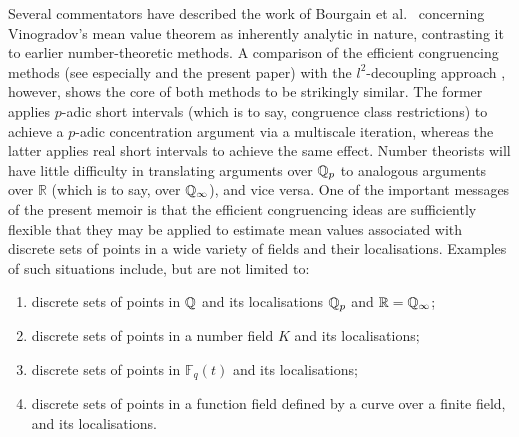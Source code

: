 \documentclass[12pt,reqno]{amsart}
\theoremstyle{definition}
\theoremstyle{remark}
\numberwithin{equation}{section}
\def\dbF{{\mathbb F}}\def\dbK{{\mathbb K}}
\def\dbR{{\mathbb R}}\def\dbT{{\mathbb T}}
\begin{document}
Several commentators have described the work of Bourgain et al.~\cite{BDG2016} 
concerning Vinogradov's mean value theorem as inherently analytic in nature, contrasting it 
to earlier number-theoretic methods. A comparison of the efficient congruencing methods 
(see especially \cite{Woo2012, Woo2015, Woo2016, Woo2017} and the present paper) with 
the $l^2$-decoupling approach \cite{BDG2016}, however, shows the core of both methods 
to be strikingly similar. The former applies $p$-adic short intervals (which is to say, 
congruence class restrictions) to achieve a $p$-adic concentration argument via a 
multiscale iteration, whereas the latter applies real short intervals to achieve the same 
effect. Number theorists will have little difficulty in translating arguments over ${\mathbb Q}_p$ to 
analogous arguments over $\dbR$ (which is to say, over ${\mathbb Q}_\infty$), and vice versa. 
One of the important messages of the present memoir is that the efficient congruencing 
ideas are sufficiently flexible that they may be applied to estimate mean values associated 
with discrete sets of points in a wide variety of fields and their localisations. Examples of 
such situations include, but are not limited to:
\begin{enumerate}
\item[(i)] discrete sets of points in ${\mathbb Q}$ and its localisations ${\mathbb Q}_p$ and 
$\dbR=\dbQ_\infty$;
\item[(ii)] discrete sets of points in a number field $K$ and its localisations;
\item[(iii)] discrete sets of points in $\dbF_q(t)$ and its localisations;
\item[(iv)] discrete sets of points in a function field defined by a curve over a finite field, 
and its localisations.
\end{enumerate}
\end{document}
